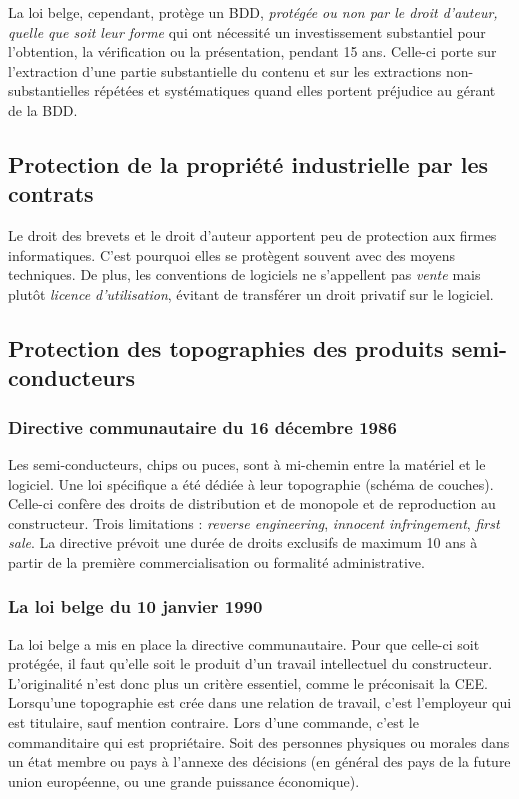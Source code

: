\documentclass[fleqn,letterpaper, 12pt]{article}
\begin{document}
	
	La loi belge, cependant, protège un BDD, \emph{protégée ou non par le droit d'auteur, quelle que soit leur forme} qui ont nécessité un investissement substantiel pour l'obtention, la vérification ou la présentation, pendant 15 ans. Celle-ci porte sur l'extraction d'une partie substantielle du contenu et sur les extractions non-substantielles répétées et systématiques quand elles portent préjudice au gérant de la BDD.
	
	\subsection{Protection de la propriété industrielle par les contrats}
	
	Le droit des brevets et le droit d'auteur apportent peu de protection aux firmes informatiques. C'est pourquoi elles se protègent souvent avec des moyens techniques. De plus, les conventions de logiciels ne s'appellent pas \emph{vente} mais plutôt \emph{licence d'utilisation}, évitant de transférer un droit privatif sur le logiciel.
	
	
	\subsection{Protection des topographies des produits semi-conducteurs}
	\subsubsection{Directive communautaire du 16 décembre 1986}
	
	Les semi-conducteurs, chips ou puces, sont à mi-chemin entre la matériel et le logiciel. Une loi spécifique a été dédiée à leur topographie (schéma de couches). Celle-ci confère des droits de distribution et de monopole et de reproduction au constructeur. Trois limitations : \emph{reverse engineering}, \emph{innocent infringement}, \emph{first sale}. La directive prévoit une durée de droits exclusifs de maximum 10 ans à partir de la première commercialisation ou formalité administrative.
	
	\subsubsection{La loi belge du 10 janvier 1990}
	
	La loi belge a mis en place la directive communautaire. Pour que celle-ci soit protégée, il faut qu'elle soit le produit d'un travail intellectuel du constructeur. L'originalité n'est donc plus un critère essentiel, comme le préconisait la CEE. Lorsqu'une topographie est crée dans une relation de travail, c'est l'employeur qui est titulaire, sauf mention contraire. Lors d'une commande, c'est le commanditaire qui est propriétaire. Soit des personnes physiques ou morales dans un état membre ou pays à l'annexe des décisions (en général des pays de la future union européenne, ou une grande puissance économique).
	
\end{document}
